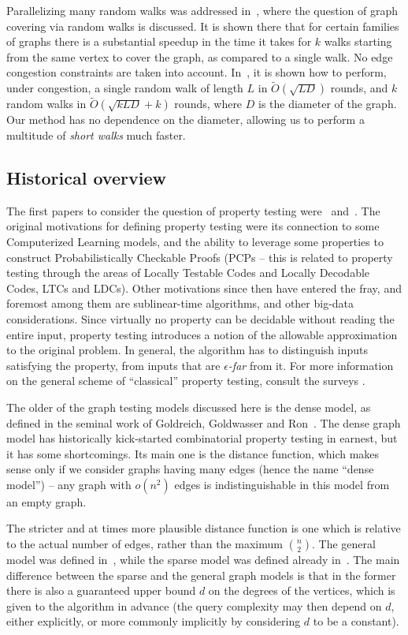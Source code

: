 \documentclass[11pt]{article}
\begin{document}
Parallelizing many random walks was addressed in~\cite{AlonAKKLT11}, where the question of graph covering via random walks is discussed. It is shown there that for certain families of graphs there is a substantial speedup in the time it takes for $k$ walks starting from the same vertex to cover the graph, as compared to a single walk. No edge congestion constraints are taken into account.
In~\cite{SarmaNPT13}, it is shown how to perform, under congestion, a single random walk of length $L$ in $\tilde{O}(\sqrt{LD})$ rounds, and $k$ random walks in $\tilde{O}(\sqrt{kLD} +k)$ rounds, where $D$ is the diameter of the graph. Our method has no dependence on the diameter, allowing us to perform a multitude of \emph{short walks} much faster.

\subsection{Historical overview}
The first papers to consider the question of property testing were~\cite{BLR93} and~\cite{RS96}.
The original motivations for defining property testing were its connection to some Computerized
Learning models, and the ability to leverage some properties to construct Probabilistically
Checkable Proofs (PCPs -- this is related to property testing through the areas of Locally Testable
Codes and Locally Decodable Codes, LTCs and LDCs). Other motivations since then have entered the
fray, and foremost among them are sublinear-time algorithms, and other big-data considerations.
Since virtually no property can be decidable without reading the entire input, property testing
introduces a notion of the allowable approximation to the original problem. In general, the
algorithm has to distinguish inputs satisfying the property, from inputs that are {\em
$\epsilon$-far} from it.  For more information on the general scheme of ``classical'' property
testing, consult the surveys \cite{Ron08,Fischer,GR10}.

The older of the graph testing models discussed here is the dense model, as defined in the seminal work of Goldreich, Goldwasser and Ron~\cite{GGR98}.
The dense graph model has historically kick-started combinatorial property testing in earnest, but it has some shortcomings. Its main one is the distance function, which makes sense only if we consider graphs having many edges (hence the name ``dense model'') -- any graph with $o(n^2)$ edges is indistinguishable in this model from an empty graph.

The stricter and at times more plausible distance function is one which is relative to the actual number of edges, rather than the maximum $\binom{n}{2}$. The general model was defined in~\cite{AKKR}, while the sparse model was defined already in~\cite{GoldreichR02}.
The main difference between the sparse and the general graph models is that in the former there is also a guaranteed upper bound $d$ on the degrees of the vertices, which is given to the algorithm in advance (the query complexity may then depend on $d$, either explicitly, or more commonly implicitly by considering $d$ to be a constant).
\end{document}
